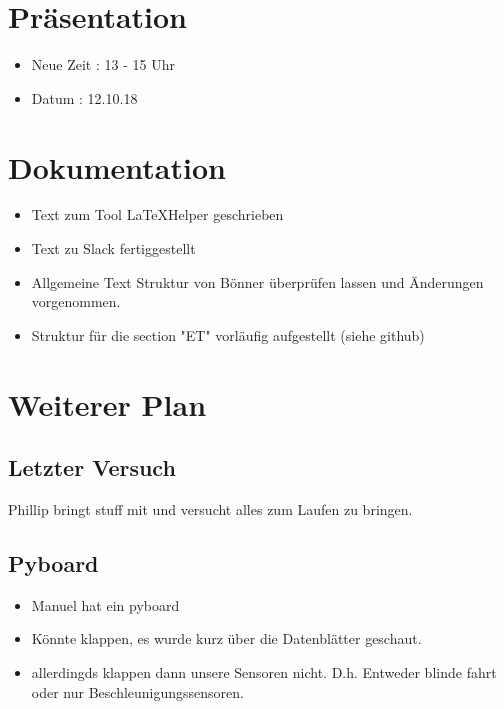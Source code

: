 \documentclass{article}
\begin{document}
\section{Präsentation}

\begin{itemize}

\item Neue Zeit : 13 - 15 Uhr

\item Datum : 12.10.18

\end{itemize}

\section{Dokumentation}

\begin{itemize}

\item Text zum Tool LaTeXHelper geschrieben

\item Text zu Slack fertiggestellt 

\item Allgemeine Text Struktur von Bönner überprüfen lassen und Änderungen vorgenommen.

\item Struktur für die section "ET" vorläufig aufgestellt (siehe github)

\end{itemize}

\section{Weiterer Plan}

\subsection{Letzter Versuch}

Phillip bringt stuff mit und versucht alles zum Laufen zu bringen.

\subsection{Pyboard}

\begin{itemize}

\item Manuel hat ein pyboard

\item Könnte klappen, es wurde kurz über die Datenblätter geschaut.

\item allerdingds klappen dann unsere Sensoren nicht. D.h. Entweder blinde fahrt oder nur Beschleunigungssensoren.

\end{itemize}
\end{document}
